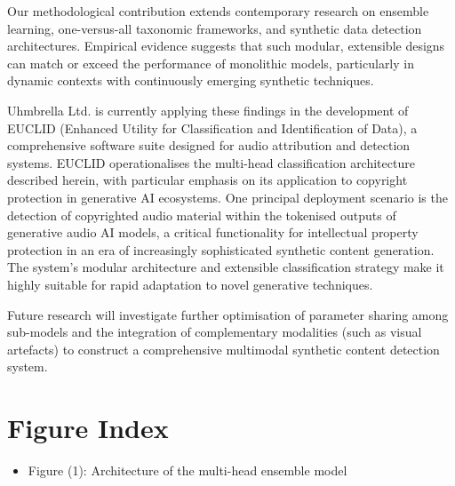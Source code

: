 \documentclass[conference]{IEEEtran}  %
\begin{document}
Our methodological contribution extends contemporary research on ensemble learning, one-versus-all taxonomic frameworks, and synthetic data detection architectures. Empirical evidence suggests that such modular, extensible designs can match or exceed the performance of monolithic models, particularly in dynamic contexts with continuously emerging synthetic techniques.

Uhmbrella Ltd. is currently applying these findings in the development of EUCLID (Enhanced Utility for Classification and Identification of Data), a comprehensive software suite designed for audio attribution and detection systems. EUCLID operationalises the multi-head classification architecture described herein, with particular emphasis on its application to copyright protection in generative AI ecosystems. One principal deployment scenario is the detection of copyrighted audio material within the tokenised outputs of generative audio AI models, a critical functionality for intellectual property protection in an era of increasingly sophisticated synthetic content generation. The system's modular architecture and extensible classification strategy make it highly suitable for rapid adaptation to novel generative techniques.

Future research will investigate further optimisation of parameter sharing among sub-models and the integration of complementary modalities (such as visual artefacts) to construct a comprehensive multimodal synthetic content detection system.




\section*{Figure Index}
\begin{itemize}
    \item Figure (1): Architecture of the multi-head ensemble model
\end{itemize}
\end{document}
